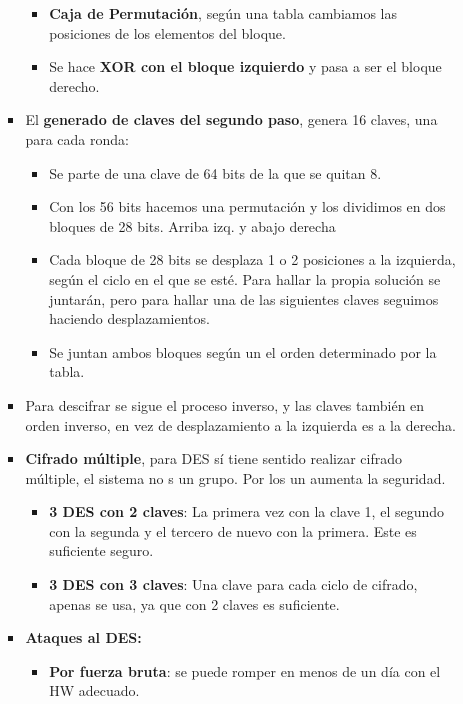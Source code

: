 \documentclass[12pt, twoside, openright]{report} %
\begin{document}
\begin{itemize}
\begin{itemize}
\begin{itemize}
\begin{itemize}
				                  \item \textbf{Caja de Permutación}, según una tabla cambiamos las posiciones de los elementos del bloque.
				                  \item Se hace \textbf{XOR con el bloque izquierdo} y pasa a ser el bloque derecho.
			                  \end{itemize}
			            \item El \textbf{generado de claves del segundo paso}, genera 16 claves, una para cada ronda:
			                  \begin{itemize}
				                  \item Se parte de una clave de 64 bits de la que se quitan 8.
				                  \item Con los 56 bits hacemos una permutación y los dividimos en dos bloques de 28 bits. Arriba izq. y abajo derecha
				                  \item Cada bloque de 28 bits se desplaza 1 o 2 posiciones a la izquierda, según el ciclo en el que se esté. Para hallar la propia solución se juntarán, pero para hallar una de las siguientes claves seguimos haciendo desplazamientos.
				                  \item Se juntan ambos bloques según un el orden determinado por la tabla.
			                  \end{itemize}
			            \item Para descifrar se sigue el proceso inverso, y las claves también en orden inverso, en vez de desplazamiento a la izquierda es a la derecha.
			            \item \textbf{Cifrado múltiple}, para DES sí tiene sentido realizar cifrado múltiple, el sistema no s un grupo. Por los un aumenta la seguridad.
			                  \begin{itemize}
				                  \item \textbf{3 DES con 2 claves}: La primera vez con la clave 1, el segundo con la segunda y el tercero de nuevo con la primera. Este es suficiente seguro.
				                  \item \textbf{3 DES con 3 claves}: Una clave para cada ciclo de cifrado, apenas se usa, ya que con 2 claves es suficiente.
			                  \end{itemize}
			            \item \textbf{Ataques al DES:}
			                  \begin{itemize}
				                  \item \textbf{Por fuerza bruta}: se puede romper en menos de un día con el HW adecuado.

\end{itemize}
\end{itemize}
\end{itemize}
\end{itemize}
\end{document}
